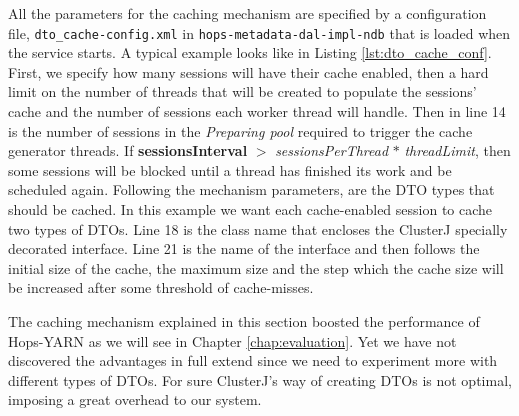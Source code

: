 

All the parameters for the caching mechanism are specified by a
configuration file, \texttt{dto\_cache-config.xml} in
\texttt{hops-metadata-dal-impl-ndb} that is loaded when
the service starts. A typical example looks like in Listing
\ref{lst:dto_cache_conf}. First, we specify how many sessions
will have their cache enabled, then a hard limit on the number
of threads that will be created to populate the sessions' cache and
the number of sessions each worker thread will handle. Then in line 14
is the number of sessions in the \emph{Preparing pool} required to
trigger the cache generator threads. If \textbf{sessionsInterval}
$>$ \emph{sessionsPerThread} $*$ \emph{threadLimit}, then some
sessions will be blocked until a thread has finished its work and be
scheduled again. Following the mechanism parameters, are the DTO types
that should be cached. In this example we want each cache-enabled
session to cache two types of DTOs. Line 18 is the class name that
encloses the ClusterJ specially decorated interface. Line 21 is the
name of the interface and then follows the initial size of the cache,
the maximum size and the step which the cache size will be increased after some
threshold of cache-misses.

The caching mechanism explained in this section boosted the
performance of Hops-YARN as we will see in Chapter \ref{chap:evaluation}. Yet
we have not discovered the advantages in full extend since we need to
experiment more with different types of DTOs. For sure ClusterJ's way
of creating DTOs is not optimal, imposing a great overhead to our system.